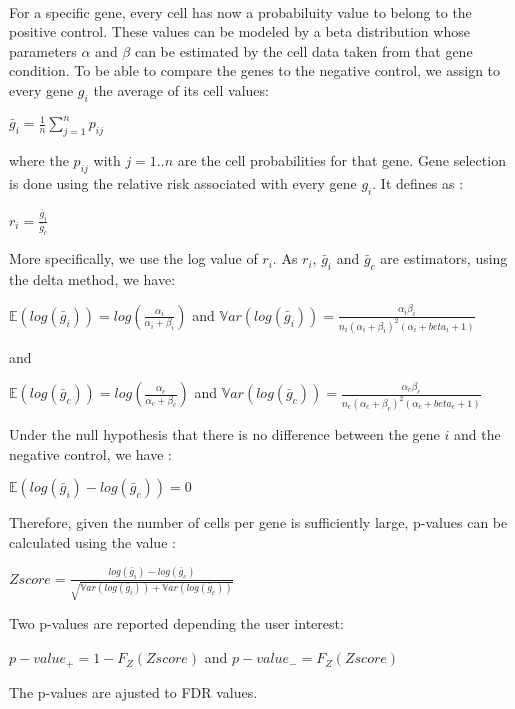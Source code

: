 \documentclass[a4paper,10pt]{article}
\begin{document}
\paragraph{}
For a specific gene, every cell has now a probabiluity value to belong to the positive control. These
values can be modeled by a beta distribution whose parameters $\alpha$ and $\beta$ can be estimated by the cell data taken
from that gene condition. To be able to compare the genes to the negative control, we assign to every
gene $g_{i}$ the average of its cell values:   
\begin{center}
$\bar{g}_{i} = \frac{1}{n}\sum_{j=1}^{n}p_{ij}$
\end{center}
where the $p_{ij}$ with $j=1 .. n$ are the cell probabilities for that gene. Gene selection is done using
the relative risk associated with every gene $g_{i}$. It defines as :
\begin{center}
$r_{i} = \frac{\bar{g}_{i}}{\bar{g}_{c}} $
\end{center}
More specifically, we use the log value of $r_{i}$. As $r_{i}$, $\bar{g}_{i}$ and $\bar{g}_{c}$ are estimators, 
using the delta method, we have:
\begin{center}
$\mathbb{E}(log(\bar{g}_{i})) = log(\frac{\alpha_{i}}{\alpha_{i}+\beta_{i}})$ and $\mathbb{V}ar(log(\bar{g}_{i}))=\frac{\alpha_{i}\beta_{i}}
{n_{i}(\alpha_{i}+\beta_{i})^{2}(\alpha_{i}+beta_{i}+1)} $
\end{center}
and 
\begin{center}
$\mathbb{E}(log(\bar{g}_{c})) = log(\frac{\alpha_{c}}{\alpha_{c}+\beta_{c}})$ and $\mathbb{V}ar(log(\bar{g}_{c}))=\frac{\alpha_{c}\beta_{c}}
{n_{c}(\alpha_{c}+\beta_{c})^{2}(\alpha_{c}+beta_{c}+1)} $
\end{center}
Under the null hypothesis that there is no difference between the gene $i$ and the negative control, we have :
\begin{center}
$\mathbb{E}(log(\bar{g}_{i})-log(\bar{g}_{c})) = 0$
\end{center} 
Therefore, given the number of cells per gene is sufficiently large, p-values can be calculated using the value :
\begin{center}
 $Zscore = \frac{log(\bar{g}_{i})-log(\bar{g}_{c})}{\sqrt{\mathbb{V}ar(log(\bar{g}_{i}))+\mathbb{V}ar(log(\bar{g}_{c}))}}$
\end{center} 
Two p-values are reported depending the user interest:
\begin{center}
$p-value_{+} = 1 - F_{Z}(Zscore)$ and $p-value_{-} = F_{Z}(Zscore)$
\end{center}
The p-values are ajusted to FDR values.
\end{document}
